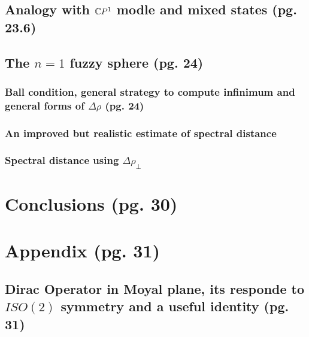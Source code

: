 \documentclass{article}
\begin{document}
\subsection{Analogy with $\mathbb{C} P^1$ modle and mixed states (pg. 23.6)}


\subsection{The $n=1$ fuzzy sphere (pg. 24)}

\subsubsection{Ball condition, general strategy to compute infinimum and general forms of $\Delta \rho$ (pg. 24)}%

\subsubsection{An improved but realistic estimate of spectral distance}%

\subsubsection{Spectral distance using $\Delta \rho_{\perp}$}%




\section{Conclusions (pg. 30)}

\section{Appendix (pg. 31)}

\subsection{Dirac Operator in Moyal plane, its responde to $ISO(2)$ symmetry and a useful identity (pg. 31)}
\end{document}
